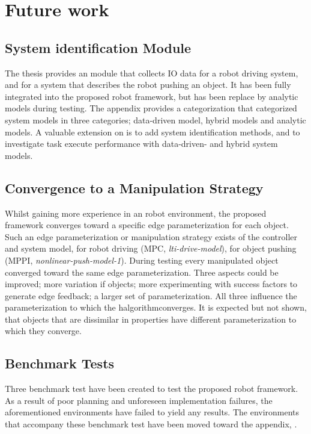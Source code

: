\chapter{Future work}%
\label{chap:future_work}

\section*{System identification Module}
The thesis provides an module that collects \ac{IO} data for a robot driving system, and for a system that describes the robot pushing an object. It has been fully integrated into the proposed robot framework, but has been replace by analytic models during testing. The appendix provides a categorization that categorized system models in three categories; data-driven model, hybrid models and analytic models. A valuable extension on is to add system identification methods, and to investigate task execute performance with data-driven- and hybrid system models.\bs

\section*{Convergence to a Manipulation Strategy}
Whilst gaining more experience in an robot environment, the proposed framework converges toward a specific edge parameterization for each object. Such an edge parameterization or manipulation strategy exists of the controller and system model, for robot driving (\ac{MPC}, \textit{lti-drive-model}), for object pushing (\ac{MPPI}, \textit{nonlinear-push-model-1}). During testing every manipulated object converged toward the same edge parameterization. Three aspects could be improved; more variation if objects; more experimenting with success factors to generate edge feedback; a larger set of parameterization. All three influence the parameterization to which the \ac{halgorithm}converges. It is expected but not shown, that objects that are dissimilar in properties have different parameterization to which they converge. 

\section*{Benchmark Tests}
Three benchmark test have been created to test the proposed robot framework. As a result of poor planning and unforeseen implementation failures, the aforementioned environments have failed to yield any results. The environments that accompany these benchmark test have been moved toward the appendix, .\bs

